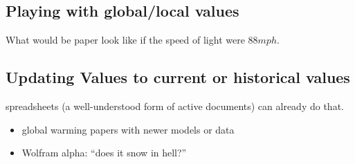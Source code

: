 \subsection{Playing with global/local values}
What would be paper look like if the speed of light were $88 mph$. 

\subsection{Updating Values to current or historical values}
spreadsheets (a well-understood form of active documents) can already do that. 
\begin{itemize}
\item global warming papers with newer models or data
\item Wolfram alpha: ``does it snow in hell?''
\end{itemize}




